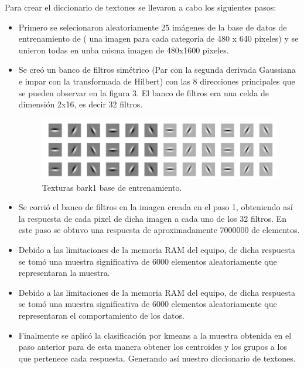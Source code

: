 \documentclass[10pt,twocolumn,letterpaper]{article}
\begin{document}
Para crear el diccionario de textones se llevaron a cabo los siguientes pasos:
\begin{itemize}
\item Primero se selecionaron aleatoriamente 25 imágenes de la base de datos de entrenamiento de ( una imagen para cada categoría de 480 x 640 pixeles) y se unieron todas en unba misma imagen de 480x1600 pixeles.

\item Se creó un banco de filtros simétrico (Par con la segunda derivada Gaussiana e impar con la transformada de Hilbert) con las 8 direcciones principales que se pueden observar en la figura 3. El banco de filtros era una celda de dimensión 2x16, es decir 32 filtros.

\begin{figure}[t]
\begin{center}
   \includegraphics[width=1\linewidth]{fb.png}
\end{center}
   \caption{Texturas bark1 base de entrenamiento.}
\label{fig:seg}
\end{figure}

\item Se corrió el banco de filtros en la imagen creada en el paso 1, obteniendo así la respuesta de cada pixel de dicha imagen a cada uno de los 32 filtros. En este paso se obtuvo una respuesta de aproximadamente 7000000 de elementos.

\item Debido a las limitaciones de la memoria RAM del equipo, de dicha respuesta se tomó una muestra significativa de 6000 elementos aleatoriamente que representaran la muestra.

\item Debido a las limitaciones de la memoria RAM del equipo, de dicha respuesta se tomó una muestra significativa de 6000 elementos aleatoriamente que representaran el comportamiento de los datos.

\item Finalmente se aplicó la clasificación por kmeans a la muestra obtenida en el paso anterior para de esta manera obtener los centroides y los grupos a los que pertenece cada respuesta. Generando así nuestro diccionario de textones.

\end{itemize}
\end{document}
